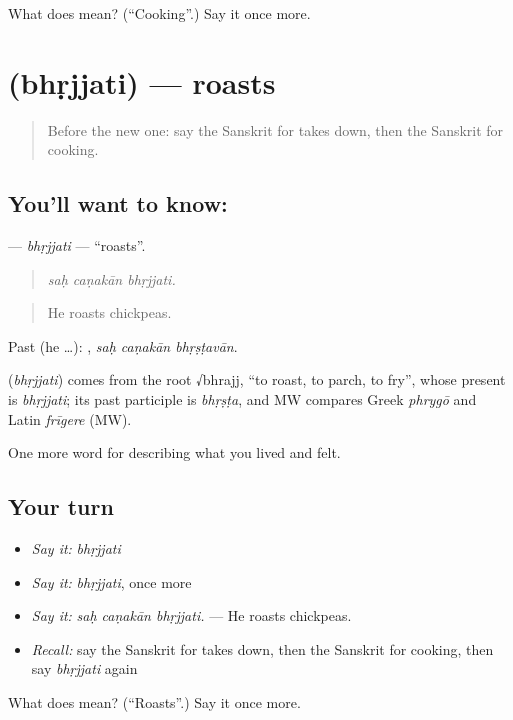 \begin{tcolorbox}[breakable,colback=teal!4,colframe=teal!35!black,title={Before you move on}]
What does  mean? (\textquotedblleft{}Cooking\textquotedblright{}.) Say it once more.
\end{tcolorbox}
\section[\texorpdfstring{\sk{भृज्जति} (bhṛjjati)}{भृज्जति (bhṛjjati)}]{ (bhṛjjati) — roasts}

\label{lesson:SA-C511-bhrjjati}



\begin{quote}
Before the new one: say the Sanskrit for takes down, then the Sanskrit for cooking.
\end{quote}

\subsection*{You'll want to know: }
\textbf{} — \emph{bhṛjjati} — \textquotedblleft{}roasts\textquotedblright{}.

\begin{quote}
  
\end{quote}

\begin{quote}
\emph{saḥ caṇakān bhṛjjati.}
\end{quote}

\begin{quote}
He roasts chickpeas.
\end{quote}

Past (he …):   , \emph{saḥ caṇakān bhṛṣṭavān}.

\begin{cousinweb}
\textbf{} (\emph{bhṛjjati}) comes from the root √bhrajj, \textquotedblleft{}to roast, to parch, to fry\textquotedblright{}, whose present is \emph{bhṛjjati}; its past participle is \emph{bhṛṣṭa}, and MW compares Greek \emph{phrygō} and Latin \emph{frīgere} (MW).
\end{cousinweb}

\begin{grammarlens}[title={What you've built}]
One more word for describing what you lived and felt.
\end{grammarlens}

\subsection*{Your turn}
\begin{itemize}
\raggedright
  \item \emph{Say it:} \emph{bhṛjjati}
  \item \emph{Say it:} \emph{bhṛjjati}, once more
  \item \emph{Say it:} \emph{saḥ caṇakān bhṛjjati.} — He roasts chickpeas.
  \item \emph{Recall:} say the Sanskrit for takes down, then the Sanskrit for cooking, then say \emph{bhṛjjati} again
\end{itemize}

\begin{tcolorbox}[breakable,colback=teal!4,colframe=teal!35!black,title={Before you move on}]
What does  mean? (\textquotedblleft{}Roasts\textquotedblright{}.) Say it once more.
\end{tcolorbox}
